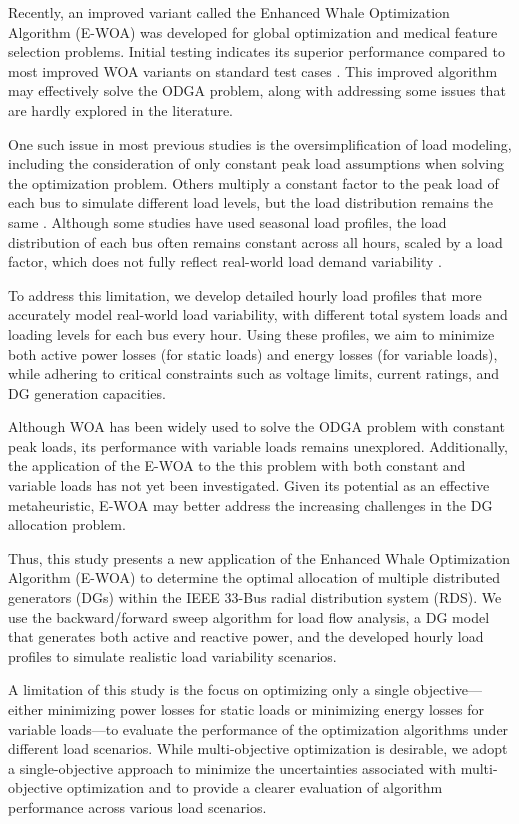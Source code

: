 \documentclass[conference]{IEEEtran}
\begin{document}
Recently, an improved variant called the Enhanced Whale Optimization Algorithm (E-WOA) was developed for global optimization and medical feature selection problems. Initial testing indicates its superior performance compared to most improved WOA variants on standard test cases \cite{EWOA}. This improved algorithm may effectively solve the ODGA problem, along with addressing some issues that are hardly explored in the literature.

One such issue in most previous studies is the oversimplification of load modeling, including the consideration of only constant peak load assumptions when solving the optimization problem. Others multiply a constant factor to the peak load of each bus to simulate different load levels, but the load distribution remains the same \cite{WOAreview2}. Although some studies have used seasonal load profiles, the load distribution of each bus often remains constant across all hours, scaled by a load factor, which does not fully reflect real-world load demand variability \cite{purluseasonal}.

To address this limitation, we develop detailed hourly load profiles that more accurately model real-world load variability, with different total system loads and loading levels for each bus every hour. Using these profiles, we aim to minimize both active power losses (for static loads) and energy losses (for variable loads), while adhering to critical constraints such as voltage limits, current ratings, and DG generation capacities.

Although WOA has been widely used to solve the ODGA problem with constant peak loads, its performance with variable loads remains unexplored. Additionally, the application of the E-WOA to the this problem with both constant and variable loads has not yet been investigated. Given its potential as an effective metaheuristic, E-WOA may better address the increasing challenges in the DG allocation problem.

Thus, this study presents a new application of the Enhanced Whale Optimization Algorithm (E-WOA) to determine the optimal allocation of multiple distributed generators (DGs) within the IEEE 33-Bus radial distribution system (RDS). We use the backward/forward sweep algorithm for load flow analysis, a DG model that generates both active and reactive power, and the developed hourly load profiles to simulate realistic load variability scenarios.

A limitation of this study is the focus on optimizing only a single objective—either minimizing power losses for static loads or minimizing energy losses for variable loads—to evaluate the performance of the optimization algorithms under different load scenarios. While multi-objective optimization is desirable, we adopt a single-objective approach to minimize the uncertainties associated with multi-objective optimization and to provide a clearer evaluation of algorithm performance across various load scenarios. 
\end{document}
